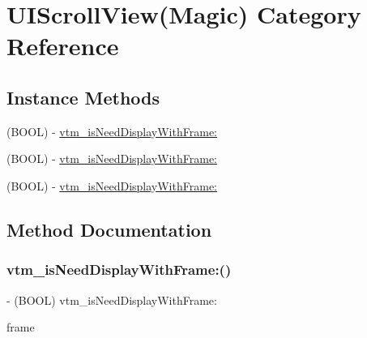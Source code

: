 \hypertarget{category_u_i_scroll_view_07_magic_08}{}\section{U\+I\+Scroll\+View(Magic) Category Reference}
\label{category_u_i_scroll_view_07_magic_08}
\subsection*{Instance Methods}
\begin{DoxyCompactItemize}
\item 
(B\+O\+OL) -\/ \mbox{\hyperlink{category_u_i_scroll_view_07_magic_08_a386f3ae8fad7768de76b7d3ac1ffd6a7}{vtm\+\_\+is\+Need\+Display\+With\+Frame\+:}}
\item 
(B\+O\+OL) -\/ \mbox{\hyperlink{category_u_i_scroll_view_07_magic_08_a386f3ae8fad7768de76b7d3ac1ffd6a7}{vtm\+\_\+is\+Need\+Display\+With\+Frame\+:}}
\item 
(B\+O\+OL) -\/ \mbox{\hyperlink{category_u_i_scroll_view_07_magic_08_a386f3ae8fad7768de76b7d3ac1ffd6a7}{vtm\+\_\+is\+Need\+Display\+With\+Frame\+:}}
\end{DoxyCompactItemize}


\subsection{Method Documentation}
\mbox{\label{category_u_i_scroll_view_07_magic_08_a386f3ae8fad7768de76b7d3ac1ffd6a7}} 
\subsubsection{\texorpdfstring{vtm\+\_\+is\+Need\+Display\+With\+Frame\+:()}{vtm\_isNeedDisplayWithFrame:()}\hspace{0.1cm}{\footnotesize\ttfamily [1/3]}}
{\footnotesize\ttfamily -\/ (B\+O\+OL) vtm\+\_\+is\+Need\+Display\+With\+Frame\+: \begin{DoxyParamCaption}\item[{(C\+G\+Rect)}]{frame }\end{DoxyParamCaption}}

